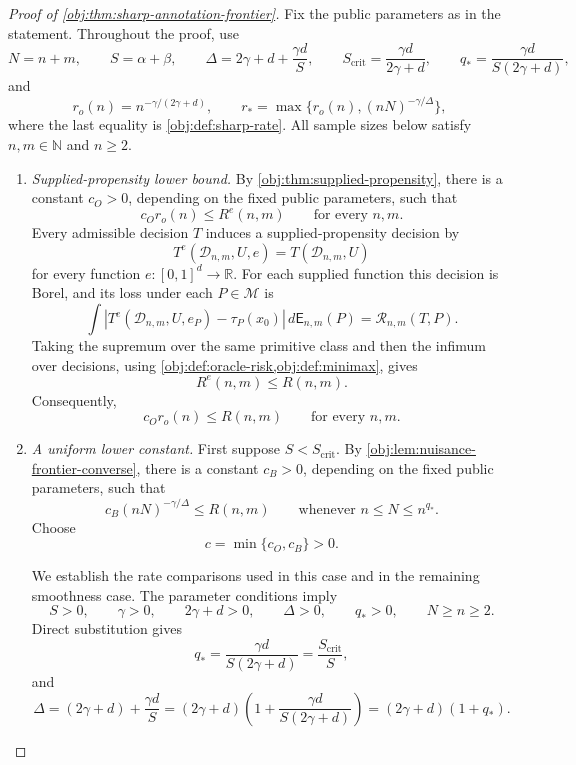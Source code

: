 \documentclass[11pt]{article}
\begin{document}
\begin{proof}[Proof of \cref{obj:thm:sharp-annotation-frontier}]
Fix the public parameters as in the statement. Throughout the proof, use
\[
N=n+m,\qquad S=\alpha+\beta,\qquad
\Delta=2\gamma+d+\frac{\gamma d}{S},\qquad
S_{\mathrm{crit}}=\frac{\gamma d}{2\gamma+d},\qquad
q_*=\frac{\gamma d}{S(2\gamma+d)},
\]
and
\[
r_o(n)=n^{-\gamma/(2\gamma+d)},\qquad
r_*=\max\{r_o(n),(nN)^{-\gamma/\Delta}\},
\]
where the last equality is \cref{obj:def:sharp-rate}. All sample sizes below satisfy \(n,m\in\mathbb N\) and \(n\ge2\).

\begin{enumerate}
\item \emph{Supplied-propensity lower bound.}
By \cref{obj:thm:supplied-propensity}, there is a constant \(c_O>0\), depending on the fixed public parameters, such that
\[
c_O r_o(n)\le R^e(n,m)
\qquad\text{for every }n,m.
\]
Every admissible decision \(T\) induces a supplied-propensity decision by
\[
T^e(\mathcal D_{n,m},U,e)=T(\mathcal D_{n,m},U)
\]
for every function \(e:[0,1]^d\to\mathbb R\). For each supplied function this decision is Borel, and its loss under each \(P\in\mathcal M\) is
\[
\int
\left|T^e(\mathcal D_{n,m},U,e_P)-\tau_P(x_0)\right|
\,d\mathsf E_{n,m}(P)
=
\mathcal R_{n,m}(T,P).
\]
Taking the supremum over the same primitive class and then the infimum over decisions, using \cref{obj:def:oracle-risk,obj:def:minimax}, gives
\[
R^e(n,m)\le R(n,m).
\]
Consequently,
\[
c_O r_o(n)\le R(n,m)
\qquad\text{for every }n,m.
\]

\item \emph{A uniform lower constant.}
First suppose \(S<S_{\mathrm{crit}}\). By
\cref{obj:lem:nuisance-frontier-converse}, there is a constant \(c_B>0\), depending on the fixed public parameters, such that
\[
c_B(nN)^{-\gamma/\Delta}\le R(n,m)
\qquad\text{whenever }n\le N\le n^{q_*}.
\]
Choose
\[
c=\min\{c_O,c_B\}>0.
\]

We establish the rate comparisons used in this case and in the remaining smoothness case. The parameter conditions imply
\[
S>0,\qquad \gamma>0,\qquad 2\gamma+d>0,\qquad
\Delta>0,\qquad q_*>0,\qquad N\ge n\ge2.
\]
Direct substitution gives
\[
q_*=
\frac{\gamma d}{S(2\gamma+d)}
=
\frac{S_{\mathrm{crit}}}{S},
\]
and
\[
\Delta
=
(2\gamma+d)+\frac{\gamma d}{S}
=
(2\gamma+d)
\left(1+\frac{\gamma d}{S(2\gamma+d)}\right)
=
(2\gamma+d)(1+q_*).
\]


\end{enumerate}
\end{proof}
\end{document}

